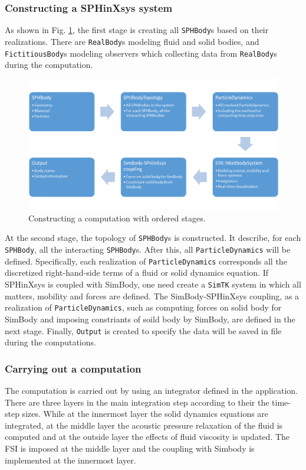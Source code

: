 \documentclass[12pt, a4paper,onecolumn]{article}
\begin{document}
\subsubsection{Constructing a SPHinXsys system}
As shown in Fig. \ref{figs:construction},
the first stage is creating all \texttt{SPHBody}s based on their realizations.
There are \texttt{RealBody}s modeling fluid and solid bodies, 
and \texttt{FictitiousBody}s modeling observers 
which collecting data from \texttt{RealBody}s during the computation. 
%
\begin{figure}[tb!]
	\centering
	\includegraphics[width=\textwidth]{figs/initialization.png}
	\caption{Constructing a computation with ordered stages. }
	\label{figs:construction}
\end{figure}
%
At the second stage, the topology of \texttt{SPHBody}s is constructed. 
It describe, for each \texttt{SPHBody}, all the interacting \texttt{SPHBody}s. 
After this, all \texttt{ParticleDynamics} will be defined.
Specifically, each realization of \texttt{ParticleDynamics} 
corresponds all the discretized right-hand-side terms of a fluid or solid dynamics equation.
If SPHinXsys is coupled with SimBody, one need create a \texttt{SimTK} system in which all matters, mobility and forces are defined. The SimBody-SPHinXsys coupling, 
as a realization of \texttt{ParticleDynamics}, 
such as computing forces on solid body for SimBody 
and imposing constriants of soild body by SimBody, are defined in the next stage.
Finally, \texttt{Output} is created to specify the data will be saved in file during the computations.
%
\subsubsection{Carrying out a computation}
The computation is carried out by using an integrator defined in the application.
There are three layers in the main integration step according to their the time-step sizes.
While at the innermost layer the solid dynamics equations are integrated, 
at the middle layer the acoustic pressure relaxation of the fluid is computed 
and at the outside layer the effects of fluid viscosity is updated.
The FSI is imposed at the middle layer 
and the coupling with Simbody is implemented at the innermost layer.
%
\newpage
\end{document}
